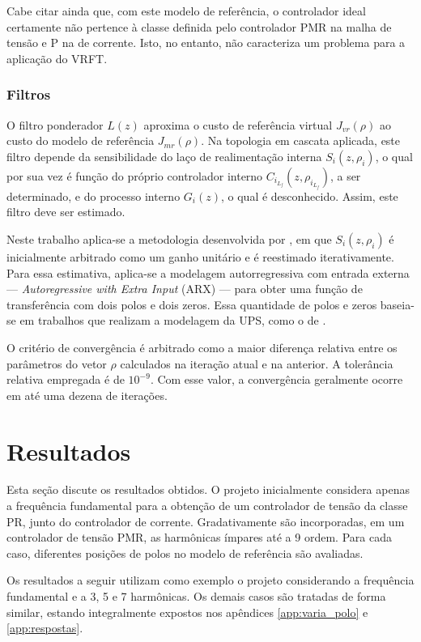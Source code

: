 \documentclass[repeatfields,oneside,overleaf]{tcc}
\newcommand{\myilf}{ {i{_{L_f}}} }
\newcommand{\myC}[2][]{ C_{#1} \left( #2 \right) }
\newcommand{\myG}[2][]{ G_{#1} \left( #2 \right) }
\newcommand{\myCzrho}[1]{ \myC[#1]{z, \rho_{#1}} }
\begin{document}
Cabe citar ainda que, com este modelo de referência, o controlador ideal certamente não pertence à classe definida pelo controlador PMR na malha de tensão e P na de corrente.
Isto, no entanto, não caracteriza um problema para a aplicação do VRFT.

\subsection{Filtros}

O filtro ponderador $L(z)$ aproxima o custo de referência virtual $J_{vr}(\rho)$ ao custo do modelo de referência $J_{mr}(\rho)$.
Na topologia em cascata aplicada, este filtro depende da sensibilidade do laço de realimentação interna $S_i(z, \rho_i)$, o qual por sua vez é função do próprio controlador interno $\myCzrho{\myilf}$, a ser determinado, e do processo interno $\myG[i]{z}$, o qual é desconhecido.
Assim, este filtro deve ser estimado.

Neste trabalho aplica-se a metodologia desenvolvida por \textcite{Chrystian2020}, em que $S_i(z, \rho_i)$ é inicialmente arbitrado como um ganho unitário e é reestimado iterativamente.
Para essa estimativa, aplica-se a modelagem autorregressiva com entrada externa --- \textit{Autoregressive with Extra Input} (ARX) --- para obter uma função de transferência com dois polos e dois zeros.
Essa quantidade de polos e zeros baseia-se em trabalhos que realizam a modelagem da UPS, como o de \textcite{Pereira2014}.

O critério de convergência é arbitrado como a maior diferença relativa entre os parâmetros do vetor $\rho$ calculados na iteração atual e na anterior.
A tolerância relativa empregada é de $10^{-9}$.
Com esse valor, a convergência geralmente ocorre em até uma dezena de iterações.

\chapter{Resultados}\label{sec:resultados}

Esta seção discute os resultados obtidos.
O projeto inicialmente considera apenas a frequência fundamental para a obtenção de um controlador de tensão da classe PR, junto do controlador de corrente.
Gradativamente são incorporadas, em um controlador de tensão PMR, as harmônicas ímpares até a 9{\textordfeminine} ordem.
Para cada caso, diferentes posições de polos no modelo de referência são avaliadas.

Os resultados a seguir utilizam como exemplo o projeto considerando a frequência fundamental e a 3{\textordfeminine}, 5{\textordfeminine} e 7{\textordfeminine} harmônicas.
Os demais casos são tratadas de forma similar, estando integralmente expostos nos apêndices \ref{app:varia_polo} e \ref{app:respostas}.
\end{document}
